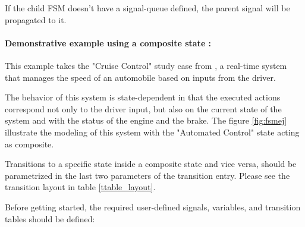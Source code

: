 \hrulefill
\newline

\begin{tcolorbox}
\HandRight If the child FSM doesn't have a signal-queue defined, the parent signal will be propagated to it.
\end{tcolorbox}


\paragraph{Demonstrative example using a composite state :} This example takes the "Cruise Control" study case from \cite{gomaa}, a real-time system that manages the speed of an automobile based on inputs from the driver. 

The behavior of this system is state-dependent in that the executed actions correspond not only to the driver input, but also on the current state of the system and with the status of the engine and the brake. 
The figure \ref{fig:fsmej} illustrate the modeling of this system with the "Automated Control" state acting as composite. \\



\begin{tcolorbox}
\HandRight Transitions to a specific state inside a composite state and vice versa, should be parametrized in the last two parameters of the transition entry. Please see the transition layout in table \ref{ttable_layout}.
\end{tcolorbox}



Before getting started, the required user-defined signals, variables, and transition tables should be defined:

